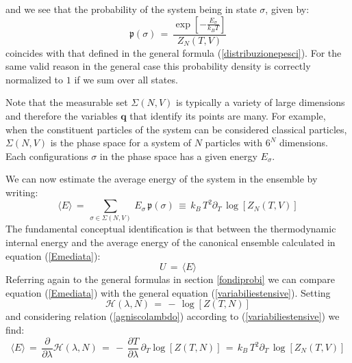 \documentclass[10pt,a4paper]{article}
\begin{document}
and we see that the probability of the system being in state
$\sigma$, given by:
\begin{equation}\label{probabener}
    \mathfrak{p}(\sigma) \, = \, \frac{\exp\left[-\frac{E_\sigma}{k_B
    T}\right]}{Z_N\left(T,V\right)}
\end{equation}
coincides with that defined in the general formula (\ref{distribuzionepesci}). For the same valid reason in the general case this probability density is correctly normalized to $1$  if we sum over all states.
\par
Note that the measurable set $\Sigma(N,V)$ is typically a variety of large dimensions and therefore the variables
$\mathbf{q}$ that identify its points are many. For example, when the constituent particles of the system can be considered classical particles, $\Sigma(N,V)$ is the phase space for a system of
$N$ particles with $6^N$ dimensions. Each
configurations $\sigma$ in the phase space has  a given energy $E_\sigma$.
\par
We can now estimate the average energy of the system in the ensemble by writing:
\begin{equation}\label{Emediata}
    \langle E \rangle \, = \, \sum_{\sigma\in\Sigma(N,V)}\, E_\sigma
    \,\mathfrak{p}(\sigma) \, \equiv \, k_B \, T^2 \partial_T
    \,\log\left[ Z_N\left(T,V\right)\right]
\end{equation}
The fundamental conceptual identification is that between the thermodynamic internal energy and the average energy of the canonical ensemble calculated in equation (\ref{Emediata}):
\begin{equation}\label{agnusco}
    U \, = \, \langle E \rangle
\end{equation}
Referring again to the general formulas in section
\ref{fondiprobi} we can compare equation (\ref{Emediata})
with the general equation (\ref{variabiliestensive}). Setting
\begin{equation}\label{carisco}
    \mathcal{H}(\lambda,N) \, = \, - \, \log\left[Z(T,N)\right]
\end{equation}
and considering  relation (\ref{agniscolambdo}) according to
(\ref{variabiliestensive}) we find:
\begin{equation}\label{ruminante}
    \langle E \rangle \, = \, \frac{\partial}{\partial \lambda}\mathcal{H}(\lambda,N)
    \, = \, - \,\frac{\partial T}{\partial \lambda} \, \partial_T
    \log\left[Z(T,N)\right] \, = \, k_B \, T^2 \partial_T
    \,\log\left[ Z_N\left(T,V\right)\right]
\end{equation}
\end{document}
